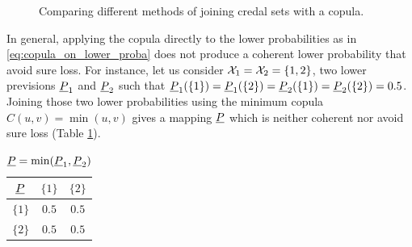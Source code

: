 \begin{figure}[!hb]
    \centering
    \caption{Comparing different methods of joining credal sets with a copula.}
    \label{fig:meaning_computation}
\end{figure}

In general, applying the copula directly to the lower probabilities as in \eqref{eq:copula_on_lower_proba} does not produce a coherent lower probability that avoid sure loss. For instance, let us consider ${\mathcal{X}}_1 = {\mathcal{X}}_2 = \{1, 2\}$, two lower previsions ${\underline{P}}_1$ and ${\underline{P}}_2$ such that ${\underline{P}}_1(\{1\}) = {\underline{P}}_1(\{2\}) = {\underline{P}}_2(\{1\}) = {\underline{P}}_2(\{2\}) = 0.5$. Joining those two lower probabilities using the minimum copula $C(u,v)=\min(u,v)$ gives a mapping ${\underline{P}}$ which is neither coherent nor avoid sure loss (Table \ref{tab:non_coherent_lower}).

\begin{table}[!ht]
    \centering
    \begin{tabular}{|c||c|c|}
        \hline
        \hspace{0.2cm} ${\underline{P}}$ \hspace{0.2cm} & \hspace{0.2cm} $\{1\}$ \hspace{0.2cm} & \hspace{0.2cm} $\{2\}$ \hspace{0.2cm} \\\hline\hline
        $\{1\}$ & $0.5$ & $0.5$ \\\hline
        $\{2\}$ & $0.5$ & $0.5$\\
        \hline
        \end{tabular}
        \caption{${\underline{P}} = \min({\underline{P}}_1, {\underline{P}}_2)$}
        \label{tab:non_coherent_lower}
\end{table}

